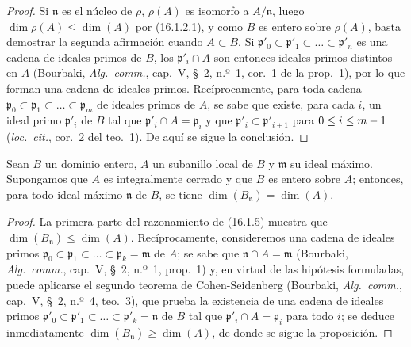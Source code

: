 \begin{proof}
Si $\mathfrak{n}$ es el núcleo de $\rho$, $\rho(A)$ es isomorfo a
$A/\mathfrak{n}$, luego $\dim\rho(A)\leq\dim(A)$ por (16.1.2.1), y como $B$
es entero sobre $\rho(A)$, basta demostrar la segunda afirmación cuando
$A\subset B$. Si
$\mathfrak{p}'_0\subset\mathfrak{p}'_1\subset\ldots\subset\mathfrak{p}'_n$
es una cadena de ideales primos de $B$, los $\mathfrak{p}'_i\cap A$ son
entonces ideales primos distintos en $A$ (Bourbaki, \emph{Alg.~comm.}, cap.~V,
\S~2, n.º~1, cor.~1 de la prop.~1), por lo que forman una cadena de ideales
primos. Recíprocamente, para toda cadena
$\mathfrak{p}_0\subset\mathfrak{p}_1\subset\ldots\subset\mathfrak{p}_m$
de ideales primos de $A$, se sabe que existe, para cada $i$, un ideal primo
$\mathfrak{p}'_i$ de $B$ tal que $\mathfrak{p}'_i\cap A=\mathfrak{p}_i$ y que
$\mathfrak{p}'_i\subset\mathfrak{p}'_{i+1}$ para $0\leq i\leq m- 1$
(\emph{loc.~cit.}, cor.~2 del teo.~1). De aquí se sigue la conclusión.
\end{proof}

\begin{proposition}[16.1.6]
\label{0.16.1.6-fr}
Sean $B$ un dominio entero, $A$ un subanillo local de $B$ y $\mathfrak{m}$ su
ideal máximo. Supongamos que $A$ es integralmente cerrado y que $B$ es entero
sobre $A$; entonces, para todo ideal máximo $\mathfrak{n}$ de $B$, se tiene
$\dim(B_{\mathfrak{n}})=\dim(A)$.
\end{proposition}

\begin{proof}
La primera parte del razonamiento de (16.1.5) muestra que
$\dim(B_{\mathfrak{n}})\leq\dim(A)$. Recíprocamente, consideremos una cadena
de ideales primos
$\mathfrak{p}_0\subset\mathfrak{p}_1\subset\ldots\subset
\mathfrak{p}_k=\mathfrak{m}$ de $A$; se sabe que
$\mathfrak{n}\cap A=\mathfrak{m}$ (Bourbaki, \emph{Alg.~comm.}, cap.~V,
\S~2, n.º~1, prop.~1) y, en virtud de las hipótesis formuladas, puede aplicarse
el segundo teorema de Cohen-Seidenberg (Bourbaki, \emph{Alg.~comm.}, cap.~V,
\S~2, n.º~4, teo.~3), que prueba la existencia de una cadena de ideales primos
$\mathfrak{p}'_0\subset\mathfrak{p}'_1\subset\ldots\subset
\mathfrak{p}'_k=\mathfrak{n}$ de $B$ tal que
$\mathfrak{p}'_i\cap A=\mathfrak{p}_i$ para todo $i$; se deduce inmediatamente
$\dim(B_{\mathfrak{n}})\geq\dim(A)$, de donde se sigue la proposición.
\end{proof}

